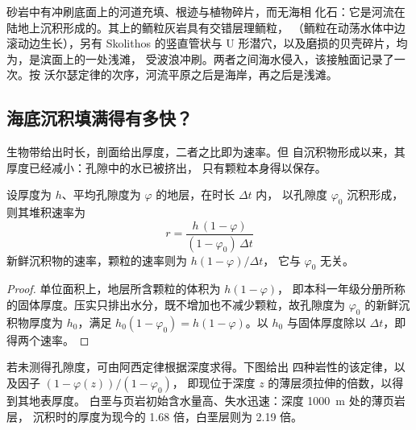 \begin{example}[瓦尔登盖层的底部]\label{ex:b2:palaeoenvironments:base}
砂岩中有冲刷底面上的河道充填、根迹与植物碎片，而无海相
化石：它是河流在陆地上沉积形成的。其上的鲕粒灰岩具有交错层理鲕粒，
（鲕粒在动荡水体中边滚动边生长），另有 Skolithos
的竖直管状与 U 形潜穴，以及磨损的贝壳碎片，均为，是滨面上的一处浅滩，
受波浪冲刷。两者之间海水侵入，该接触面记录了一次。按
沃尔瑟定律的次序，河流平原之后是海岸，再之后是浅滩。
\end{example}

\subsection*{海底沉积填满得有多快？}

生物带给出时长，剖面给出厚度，二者之比即为速率。但
自沉积物形成以来，其厚度已经减小：孔隙中的水已被挤出，
只有颗粒本身得以保存。

\begin{proposition}[压实地层的堆积速率]\label{prop:b2:palaeoenvironments:rate}
设厚度为 $h$、平均孔隙度为 $\varphi$ 的地层，在时长 $\Delta t$ 内，
以孔隙度 $\varphi_0$ 沉积形成，则其堆积速率为
\[
  r = \frac{h\,(1 - \varphi)}{(1 - \varphi_0)\,\Delta t}
\]
新鲜沉积物的速率，颗粒的速率则为 $h(1-\varphi)/\Delta t$，
它与 $\varphi_0$ 无关。
\end{proposition}

\begin{proof}
单位面积上，地层所含颗粒的体积为 $h(1 - \varphi)$，
即本科一年级分册所称的固体厚度。压实只排出水分，既不增加也不减少颗粒，故孔隙度为
$\varphi_0$ 的新鲜沉积物厚度为 $h_0$，满足 $h_0(1 - \varphi_0) = h(1 -
\varphi)$。以 $h_0$ 与固体厚度除以 $\Delta t$，即得两个速率。
\end{proof}

若未测得孔隙度，可由阿西定律根据深度求得。下图给出
四种岩性的该定律，以及因子 $(1 - \varphi(z))/(1 - \varphi_0)$，
即现位于深度 $z$ 的薄层须拉伸的倍数，以得到其地表厚度。
白垩与页岩初始含水量高、失水迅速：深度 \qty{1000}{m} 处的薄页岩层，
沉积时的厚度为现今的 1.68 倍，白垩层则为 2.19 倍。

